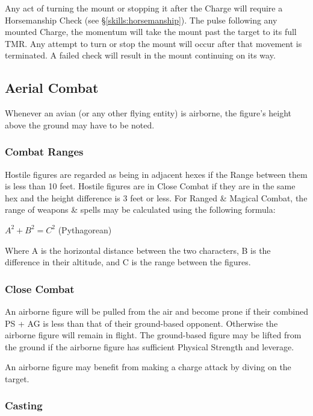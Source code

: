 \begin{multicols*}{3}
Any act of turning the mount or stopping it after the Charge will
require a Horsemanship Check (see \S \ref{skills:horsemanship}). The
pulse following any mounted Charge, the momentum will take the mount
past the target to its full TMR. Any attempt to turn or stop the mount
will occur after that movement is terminated. A failed check will
result in the mount continuing on its way.

\subsection{Aerial Combat}

Whenever an avian (or any other flying entity) is airborne, the
figure's height above the ground may have to be noted.

\subsubsection{Combat Ranges}

Hostile figures are regarded as being in adjacent hexes if the Range
between them is less than 10 feet. Hostile figures are in Close Combat
if they are in the same hex and the height difference is 3 feet or
less. For Ranged \& Magical Combat, the range of weapons \& spells may
be calculated using the following formula:

$A^2 + B^2 = C^2$ (Pythagorean)

Where A is the horizontal distance between the two characters, B is
the difference in their altitude, and C is the range between the
figures.

\subsubsection{Close Combat}

An airborne figure will be pulled from the air and become prone if
their combined PS + AG is less than that of their ground-based
opponent. Otherwise the airborne figure will remain in flight. The
ground-based figure may be lifted from the ground if the airborne
figure has sufficient Physical Strength and leverage.

An airborne figure may benefit from making a charge attack by diving
on the target.

\subsubsection{Casting}


\end{multicols*}
